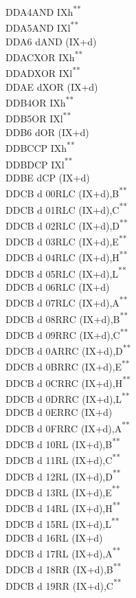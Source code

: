 \documentclass[twoside,openright,a4paper]{book}
\newcommand{\UNDOC}{\textnormal{\textsuperscript{**}}}
\begin{document}
\begin{multicols}{3}
{\begin{tabbing}
	DDA4\>AND IXh\UNDOC\\
	DDA5\>AND IXl\UNDOC\\
	DDA6 d\>AND (IX+d)\\
	DDAC\>XOR IXh\UNDOC\\
	DDAD\>XOR IXl\UNDOC\\
	DDAE d\>XOR (IX+d)\\
	DDB4\>OR IXh\UNDOC\\
	DDB5\>OR IXl\UNDOC\\
	DDB6 d\>OR (IX+d)\\
	DDBC\>CP IXh\UNDOC\\
	DDBD\>CP IXl\UNDOC\\
	DDBE d\>CP (IX+d)\\
	DDCB d 00\>RLC (IX+d),B\UNDOC\\
	DDCB d 01\>RLC (IX+d),C\UNDOC\\
	DDCB d 02\>RLC (IX+d),D\UNDOC\\
	DDCB d 03\>RLC (IX+d),E\UNDOC\\
	DDCB d 04\>RLC (IX+d),H\UNDOC\\
	DDCB d 05\>RLC (IX+d),L\UNDOC\\
	DDCB d 06\>RLC (IX+d)\\
	DDCB d 07\>RLC (IX+d),A\UNDOC\\
	DDCB d 08\>RRC (IX+d),B\UNDOC\\
	DDCB d 09\>RRC (IX+d),C\UNDOC\\
	DDCB d 0A\>RRC (IX+d),D\UNDOC\\
	DDCB d 0B\>RRC (IX+d),E\UNDOC\\
	DDCB d 0C\>RRC (IX+d),H\UNDOC\\
	DDCB d 0D\>RRC (IX+d),L\UNDOC\\
	DDCB d 0E\>RRC (IX+d)\\
	DDCB d 0F\>RRC (IX+d),A\UNDOC\\
	DDCB d 10\>RL (IX+d),B\UNDOC\\
	DDCB d 11\>RL (IX+d),C\UNDOC\\
	DDCB d 12\>RL (IX+d),D\UNDOC\\
	DDCB d 13\>RL (IX+d),E\UNDOC\\
	DDCB d 14\>RL (IX+d),H\UNDOC\\
	DDCB d 15\>RL (IX+d),L\UNDOC\\
	DDCB d 16\>RL (IX+d)\\
	DDCB d 17\>RL (IX+d),A\UNDOC\\
	DDCB d 18\>RR (IX+d),B\UNDOC\\
	DDCB d 19\>RR (IX+d),C\UNDOC\\

\end{tabbing}}
\end{multicols}
\end{document}
